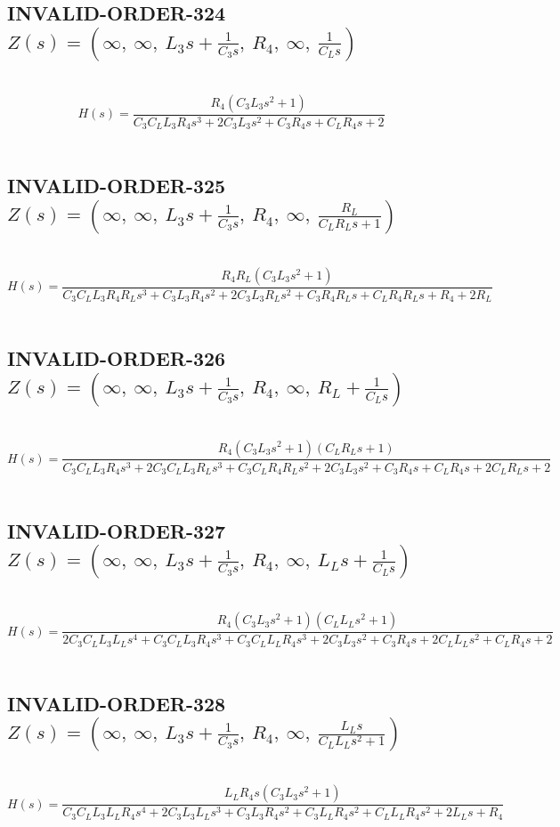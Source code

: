 \documentclass{article}
\begin{document}
\subsection{INVALID-ORDER-324 $Z(s) = \left( \infty, \  \infty, \  L_{3} s + \frac{1}{C_{3} s}, \  R_{4}, \  \infty, \  \frac{1}{C_{L} s}\right)$ } \ 
\textbf{\[H(s) = \frac{R_{4} \left(C_{3} L_{3} s^{2} + 1\right)}{C_{3} C_{L} L_{3} R_{4} s^{3} + 2 C_{3} L_{3} s^{2} + C_{3} R_{4} s + C_{L} R_{4} s + 2}\] } \ 
\subsection{INVALID-ORDER-325 $Z(s) = \left( \infty, \  \infty, \  L_{3} s + \frac{1}{C_{3} s}, \  R_{4}, \  \infty, \  \frac{R_{L}}{C_{L} R_{L} s + 1}\right)$ } \ 
\textbf{\[H(s) = \frac{R_{4} R_{L} \left(C_{3} L_{3} s^{2} + 1\right)}{C_{3} C_{L} L_{3} R_{4} R_{L} s^{3} + C_{3} L_{3} R_{4} s^{2} + 2 C_{3} L_{3} R_{L} s^{2} + C_{3} R_{4} R_{L} s + C_{L} R_{4} R_{L} s + R_{4} + 2 R_{L}}\] } \ 
\subsection{INVALID-ORDER-326 $Z(s) = \left( \infty, \  \infty, \  L_{3} s + \frac{1}{C_{3} s}, \  R_{4}, \  \infty, \  R_{L} + \frac{1}{C_{L} s}\right)$ } \ 
\textbf{\[H(s) = \frac{R_{4} \left(C_{3} L_{3} s^{2} + 1\right) \left(C_{L} R_{L} s + 1\right)}{C_{3} C_{L} L_{3} R_{4} s^{3} + 2 C_{3} C_{L} L_{3} R_{L} s^{3} + C_{3} C_{L} R_{4} R_{L} s^{2} + 2 C_{3} L_{3} s^{2} + C_{3} R_{4} s + C_{L} R_{4} s + 2 C_{L} R_{L} s + 2}\] } \ 
\subsection{INVALID-ORDER-327 $Z(s) = \left( \infty, \  \infty, \  L_{3} s + \frac{1}{C_{3} s}, \  R_{4}, \  \infty, \  L_{L} s + \frac{1}{C_{L} s}\right)$ } \ 
\textbf{\[H(s) = \frac{R_{4} \left(C_{3} L_{3} s^{2} + 1\right) \left(C_{L} L_{L} s^{2} + 1\right)}{2 C_{3} C_{L} L_{3} L_{L} s^{4} + C_{3} C_{L} L_{3} R_{4} s^{3} + C_{3} C_{L} L_{L} R_{4} s^{3} + 2 C_{3} L_{3} s^{2} + C_{3} R_{4} s + 2 C_{L} L_{L} s^{2} + C_{L} R_{4} s + 2}\] } \ 
\subsection{INVALID-ORDER-328 $Z(s) = \left( \infty, \  \infty, \  L_{3} s + \frac{1}{C_{3} s}, \  R_{4}, \  \infty, \  \frac{L_{L} s}{C_{L} L_{L} s^{2} + 1}\right)$ } \ 
\textbf{\[H(s) = \frac{L_{L} R_{4} s \left(C_{3} L_{3} s^{2} + 1\right)}{C_{3} C_{L} L_{3} L_{L} R_{4} s^{4} + 2 C_{3} L_{3} L_{L} s^{3} + C_{3} L_{3} R_{4} s^{2} + C_{3} L_{L} R_{4} s^{2} + C_{L} L_{L} R_{4} s^{2} + 2 L_{L} s + R_{4}}\] } \ 
\end{document}
